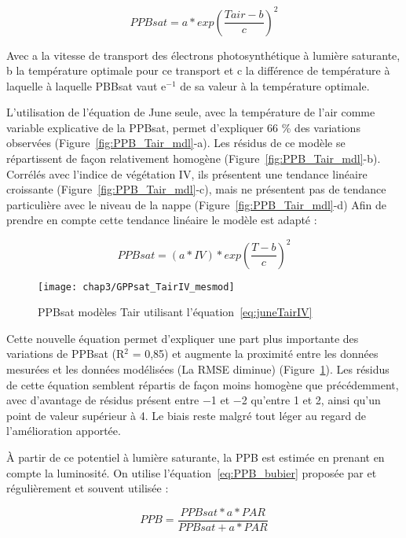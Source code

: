 \begin{equation}\label{eq:juneTair}
PPBsat = a * exp(\frac{Tair - b}{c})^2
\end{equation}

Avec a la vitesse de transport des électrons photosynthétique à lumière saturante, b la température optimale pour ce transport et c la différence de température à laquelle à laquelle PBBsat vaut e$^{-1}$ de sa valeur à la température optimale.

L'utilisation de l'équation de June seule, avec la température de l'air comme variable explicative de la PPBsat, permet d'expliquer 66 \% des variations observées (Figure~\ref{fig:PPB_Tair_mdl}-a).
Les résidus de ce modèle se répartissent de façon relativement homogène (Figure~\ref{fig:PPB_Tair_mdl}-b).
Corrélés avec l'indice de végétation IV, ils présentent une tendance linéaire croissante (Figure~\ref{fig:PPB_Tair_mdl}-c), mais ne présentent pas de tendance particulière avec le niveau de la nappe (Figure~\ref{fig:PPB_Tair_mdl}-d)
Afin de prendre en compte cette tendance linéaire le modèle est adapté :

\begin{equation}\label{eq:juneTairIV}
PPBsat = (a * IV) * exp(\frac{T - b}{c})^2
\end{equation}

\begin{figure}
\centering
\texttt{[image: chap3/GPPsat\_TairIV\_mesmod]}
\caption{PPBsat modèles Tair utilisant l'équation~\ref{eq:juneTairIV}}
\label{fig:PPBsat_TaIV_mdl}
\end{figure}

Cette nouvelle équation permet d'expliquer une part plus importante des variations de PPBsat (R$^{2}$ = 0,85) et augmente la proximité entre les données mesurées et les données modélisées (La RMSE diminue) (Figure~\ref{fig:PPBsat_TaIV_mdl}).
Les résidus de cette équation semblent répartis de façon moins homogène que précédemment, avec d'avantage de résidus présent entre \num{-1} et \num{-2} qu'entre \num{1} et 2, ainsi qu'un point de valeur supérieur à \num{4}.
Le biais reste malgré tout léger au regard de l'amélioration apportée.

À partir de ce potentiel à lumière saturante, la PPB est estimée en prenant en compte la luminosité.
On utilise l'équation~\ref{eq:PPB_bubier} proposée par \cite{bubier1998} et régulièrement et souvent utilisée \cite{bortoluzzi2006,worrall2009}:

\begin{equation} \label{eq:PPB_bubier}
PPB = \frac{PPBsat * a * PAR}{PPBsat + a * PAR}
\end{equation}

